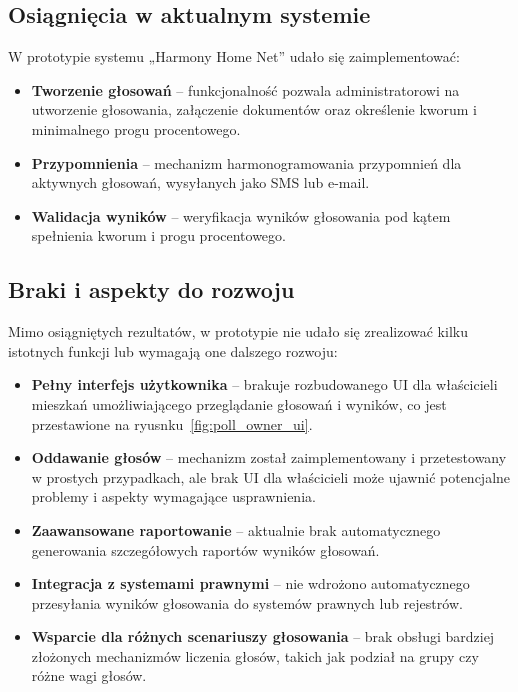 \subsection{Osiągnięcia w aktualnym systemie}

W prototypie systemu „Harmony Home Net” udało się zaimplementować:
\begin{itemize}
    \item \textbf{Tworzenie głosowań} -- funkcjonalność pozwala administratorowi na utworzenie głosowania, załączenie dokumentów oraz określenie kworum i minimalnego progu procentowego.
    \item \textbf{Przypomnienia} -- mechanizm harmonogramowania przypomnień dla aktywnych głosowań, wysyłanych jako SMS lub e-mail.
    \item \textbf{Walidacja wyników} -- weryfikacja wyników głosowania pod kątem spełnienia kworum i progu procentowego.
\end{itemize}

\subsection{Braki i aspekty do rozwoju}

Mimo osiągniętych rezultatów, w prototypie nie udało się zrealizować kilku istotnych funkcji lub wymagają one dalszego rozwoju:
\begin{itemize}
    \item \textbf{Pełny interfejs użytkownika} -- brakuje rozbudowanego UI dla właścicieli mieszkań umożliwiającego przeglądanie głosowań i wyników, co jest przestawione na ryusnku~\ref{fig:poll_owner_ui}.
    \item \textbf{Oddawanie głosów} -- mechanizm został zaimplementowany i przetestowany w prostych przypadkach, ale brak UI dla właścicieli może ujawnić potencjalne problemy i aspekty wymagające usprawnienia.
    \item \textbf{Zaawansowane raportowanie} -- aktualnie brak automatycznego generowania szczegółowych raportów wyników głosowań.
    \item \textbf{Integracja z systemami prawnymi} -- nie wdrożono automatycznego przesyłania wyników głosowania do systemów prawnych lub rejestrów.
    \item \textbf{Wsparcie dla różnych scenariuszy głosowania} -- brak obsługi bardziej złożonych mechanizmów liczenia głosów, takich jak podział na grupy czy różne wagi głosów.
\end{itemize}

